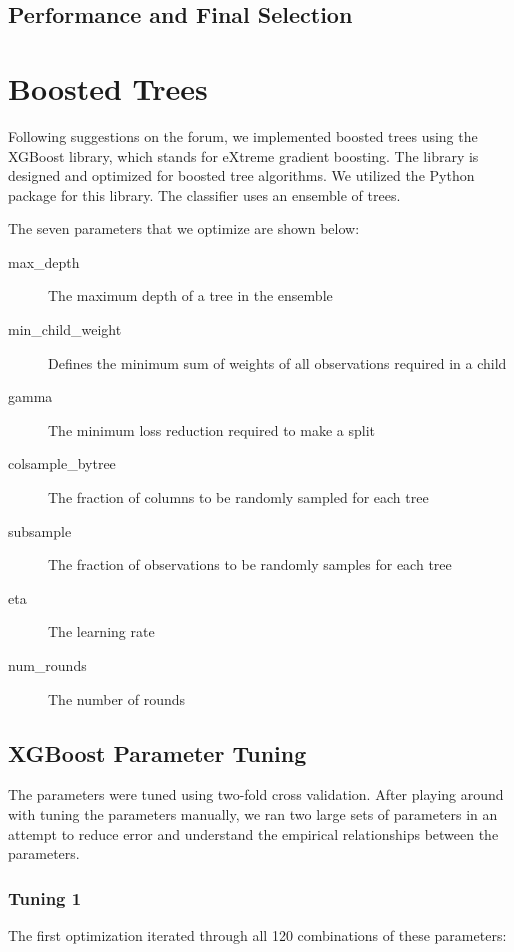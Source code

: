 \documentclass[twoside,11pt]{article}
\theoremstyle{definition}
\begin{document}
  \subsection{Performance and Final Selection}



\section{Boosted Trees}

  Following suggestions on the forum, we implemented boosted trees using the XGBoost library, which stands for eXtreme gradient boosting. The library is designed and optimized for boosted tree algorithms. We utilized the Python package for this library. The classifier uses an ensemble of trees.

  The seven parameters that we optimize are shown below:

  \begin{description}
    \item[max\_depth] The maximum depth of a tree in the ensemble
    \item[min\_child\_weight] Defines the minimum sum of weights of all observations required in a child
    \item[gamma] The minimum loss reduction required to make a split
    \item[colsample\_bytree] The fraction of columns to be randomly sampled for each tree
    \item[subsample] The fraction of observations to be randomly samples for each tree
    \item[eta] The learning rate
    \item[num\_rounds] The number of rounds
  \end{description}

  \subsection{XGBoost Parameter Tuning}
    The parameters were tuned using two-fold cross validation. After playing around with tuning the parameters manually, we ran two large sets of parameters in an attempt to reduce error and understand the empirical relationships between the parameters.

    \subsubsection{Tuning 1}
      The first optimization iterated through all 120 combinations of these parameters:
\end{document}

